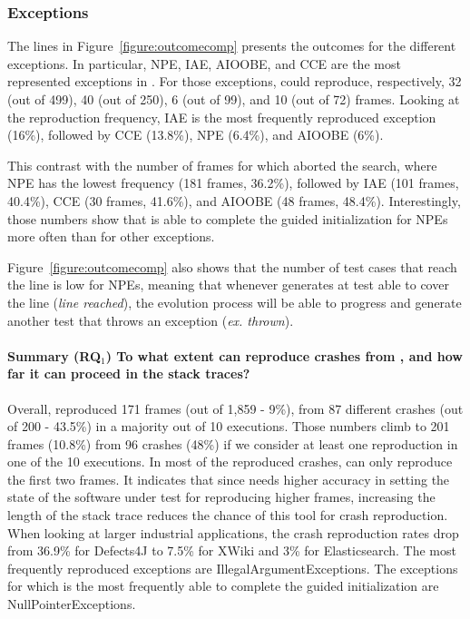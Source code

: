 \subsubsection{Exceptions}

The lines in Figure~\ref{figure:outcomecomp} presents the outcomes for the different exceptions. In particular, NPE, IAE, AIOOBE, and CCE are the most represented exceptions in \crashpack. For those exceptions, \evocrash could reproduce, respectively, 32 (out of 499), 40 (out of 250), 6 (out of 99), and 10 (out of 72) frames. Looking at the reproduction frequency, IAE is the most frequently reproduced exception (16\%), followed by CCE (13.8\%), NPE (6.4\%), and AIOOBE (6\%). 

This contrast with the number of frames for which \evocrash aborted the search, where NPE has the lowest frequency (181 frames, 36.2\%), followed by IAE (101 frames, 40.4\%), CCE (30 frames, 41.6\%), and AIOOBE (48 frames, 48.4\%). Interestingly, those numbers show that \evocrash is able to complete the guided initialization for NPEs more often than for other exceptions. 

Figure~\ref{figure:outcomecomp} also shows that the number of test cases that reach the line is low for NPEs, meaning that whenever \evocrash generates at test able to cover the line (\emph{line reached}), the evolution process will be able to progress and generate another test that throws an exception (\emph{ex. thrown}).


\paragraph{\textbf{Summary (RQ$_1$)} To what extent can \evocrash reproduce crashes from \crashpack, and how far it can proceed in the stack traces?}
%
Overall, \evocrash reproduced 171 frames (out of 1,859 - 9\%), from 87 different crashes (out of 200 - 43.5\%) in a majority out of 10 executions. Those numbers climb to 201 frames (10.8\%) from 96 crashes (48\%) if we consider at least one reproduction in one of the 10 executions.
%
In most of the reproduced crashes, \evocrash can only reproduce the first two frames. It indicates that since \evocrash needs higher accuracy in setting the state of the software under test for reproducing higher frames, increasing the length of the stack trace reduces the chance of this tool for crash reproduction. 
%
When looking at larger industrial applications, the crash reproduction rates drop from 36.9\% for Defects4J to 7.5\% for XWiki and 3\% for Elasticsearch.
%
The most frequently reproduced exceptions are IllegalArgumentExceptions. The exceptions for which \evocrash is the most frequently able to complete the guided initialization are NullPointerExceptions.


